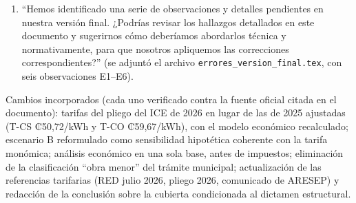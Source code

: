 \begin{enumerate}[resume]
    \item ``Hemos identificado una serie de observaciones y detalles pendientes en nuestra versión final. ¿Podrías revisar los hallazgos detallados en este documento y sugerirnos cómo deberíamos abordarlos técnica y normativamente, para que nosotros apliquemos las correcciones correspondientes?'' (se adjuntó el archivo \texttt{errores\_version\_final.tex}, con seis observaciones E1--E6).
\end{enumerate}
Cambios incorporados (cada uno verificado contra la fuente oficial citada en el documento): tarifas del pliego del ICE de 2026 en lugar de las de 2025 ajustadas (T-CS ₡50,72/kWh y T-CO ₡59,67/kWh), con el modelo económico recalculado; escenario B reformulado como sensibilidad hipotética coherente con la tarifa monómica; análisis económico en una sola base, antes de impuestos; eliminación de la clasificación ``obra menor'' del trámite municipal; actualización de las referencias tarifarias (RED julio 2026, pliego 2026, comunicado de ARESEP) y redacción de la conclusión sobre la cubierta condicionada al dictamen estructural.

